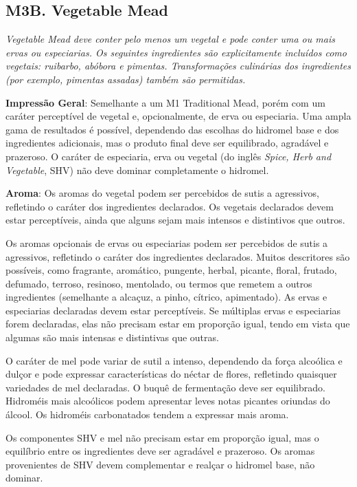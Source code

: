 \subsection*{M3B. Vegetable Mead}

\textit{Vegetable Mead deve conter pelo menos um vegetal e pode conter uma ou mais ervas ou especiarias. Os seguintes ingredientes são explicitamente incluídos como vegetais: ruibarbo, abóbora e pimentas. Transformações culinárias dos ingredientes (por exemplo, pimentas assadas) também são permitidas.}

\textbf{Impressão Geral}: Semelhante a um M1 Traditional Mead, porém com um caráter perceptível de vegetal e, opcionalmente, de erva ou especiaria. Uma ampla gama de resultados é possível, dependendo das escolhas do hidromel base e dos ingredientes adicionais, mas o produto final deve ser equilibrado, agradável e prazeroso. O caráter de especiaria, erva ou vegetal (do inglês \textit{Spice, Herb and Vegetable}, SHV) não deve dominar completamente o hidromel.

\textbf{Aroma}: Os aromas do vegetal podem ser percebidos de sutis a agressivos, refletindo o caráter dos ingredientes declarados. Os vegetais declarados devem estar perceptíveis, ainda que alguns sejam mais intensos e distintivos que outros.

Os aromas opcionais de ervas ou especiarias podem ser percebidos de sutis a agressivos, refletindo o caráter dos ingredientes declarados. Muitos descritores são possíveis, como fragrante, aromático, pungente, herbal, picante, floral, frutado, defumado, terroso, resinoso, mentolado, ou termos que remetem a outros ingredientes (semelhante a alcaçuz, a pinho, cítrico, apimentado). As ervas e especiarias declaradas devem estar perceptíveis. Se múltiplas ervas e especiarias forem declaradas, elas não precisam estar em proporção igual, tendo em vista que algumas são mais intensas e distintivas que outras.

O caráter de mel pode variar de sutil a intenso, dependendo da força alcoólica e dulçor e pode expressar características do néctar de flores, refletindo quaisquer variedades de mel declaradas. O buquê de fermentação deve ser equilibrado. Hidroméis mais alcoólicos podem apresentar leves notas picantes oriundas do álcool. Os hidroméis carbonatados tendem a expressar mais aroma.

Os componentes SHV e mel não precisam estar em proporção igual, mas o equilíbrio entre os ingredientes deve ser agradável e prazeroso. Os aromas provenientes de SHV devem complementar e realçar o hidromel base, não dominar.

